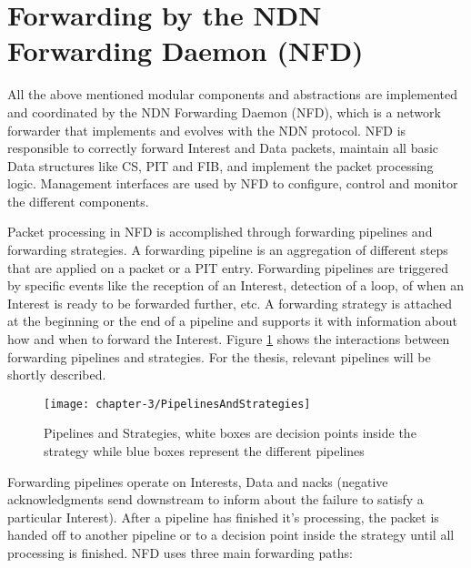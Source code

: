\section{Forwarding by the NDN Forwarding Daemon (NFD)}

\vspace{5mm} %

All the above mentioned modular components and abstractions are implemented and coordinated by the NDN Forwarding Daemon (NFD), which is a network forwarder that implements and evolves with the NDN protocol. NFD is responsible to correctly forward Interest and Data packets, maintain all basic Data structures like CS, PIT and FIB, and implement the packet processing logic. Management interfaces are used by NFD to configure, control and monitor the different components.

\vspace{5mm} %

Packet processing in NFD is accomplished through forwarding pipelines and forwarding strategies. A forwarding pipeline is an aggregation of different steps that are applied on a packet or a PIT entry. Forwarding pipelines are triggered by specific events like the reception of an Interest, detection of a loop, of when an Interest is ready to be forwarded further, etc. A forwarding strategy is attached at the beginning or the end of a pipeline and supports it with information about how and when to forward the Interest. Figure \ref{fig:PipelinesAndStrategies} shows the interactions between forwarding pipelines and strategies. For the thesis, relevant pipelines will be shortly described.

\vspace{5mm} %

\begin{figure}[H]
  \centering
  \texttt{[image: chapter-3/PipelinesAndStrategies]}
  \caption{Pipelines and Strategies, white boxes are decision points inside the strategy while blue boxes represent the different pipelines \cite{Afanasyev16}}
  \label{fig:PipelinesAndStrategies}
\end{figure}

\vspace{5mm} %

Forwarding pipelines operate on Interests, Data and nacks (negative acknowledgments send downstream to inform about the failure to satisfy a particular Interest). After a pipeline has finished it's processing, the packet is handed off to another pipeline or to a decision point inside the strategy until all processing is finished. NFD uses three main forwarding paths:

